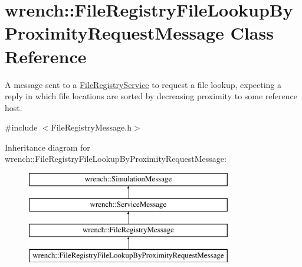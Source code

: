 \hypertarget{classwrench_1_1_file_registry_file_lookup_by_proximity_request_message}{}\section{wrench\+:\+:File\+Registry\+File\+Lookup\+By\+Proximity\+Request\+Message Class Reference}
\label{classwrench_1_1_file_registry_file_lookup_by_proximity_request_message}


A message sent to a \hyperlink{classwrench_1_1_file_registry_service}{File\+Registry\+Service} to request a file lookup, expecting a reply in which file locations are sorted by decreasing proximity to some reference host.  




{\ttfamily \#include $<$File\+Registry\+Message.\+h$>$}

Inheritance diagram for wrench\+:\+:File\+Registry\+File\+Lookup\+By\+Proximity\+Request\+Message\+:\begin{figure}[H]
\begin{center}
\leavevmode
\includegraphics[height=4.000000cm]{classwrench_1_1_file_registry_file_lookup_by_proximity_request_message}
\end{center}
\end{figure}

